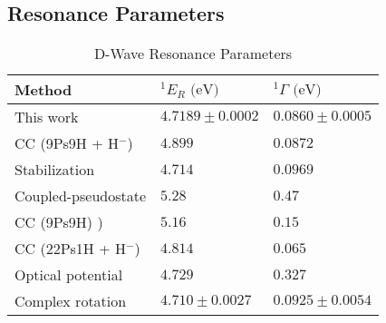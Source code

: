 \documentclass[Dissertation.tex]{subfiles}
\begin{document}


\subsection{Resonance Parameters}
\label{sec:DWaveResonance}



\setlength{\abovecaptionskip}{6pt}   %
\setlength{\belowcaptionskip}{6pt}   %
\begin{table}[H]
\centering
\begin{tabular}{l l l}
\toprule
Method & $^1E_R \text{ (eV)}$ & $^1\Gamma \text{ (eV)}$ \\
\midrule
This work & $4.7189 \pm 0.0002$ & $0.0860 \pm 0.0005$ \\
CC (9Ps9H + H$^-$) \cite{Walters2004} & $4.899$ & $0.0872$ \\
Stabilization \cite{Yan2003} & $4.714$ & $0.0969$ \\
Coupled-pseudostate \cite{Campbell1998} & $5.28$ & $0.47$ \\
CC (9Ps9H) \cite{Blackwood2002}) & $5.16$ & $0.15$ \\
CC (22Ps1H + H$^-$) \cite{Blackwood2002b} & $4.814$ & $0.065$ \\
Optical potential \cite{DiRienzi2002a} & $4.729$ & $0.327$ \\
Complex rotation \cite{Ho1998} & $4.710 \pm 0.0027$ & $0.0925 \pm 0.0054$  \\
\bottomrule
\end{tabular}
\caption{D-Wave Resonance Parameters}
\label{tab:DWaveResonancesOther}
\end{table}



\biblio
\end{document}
